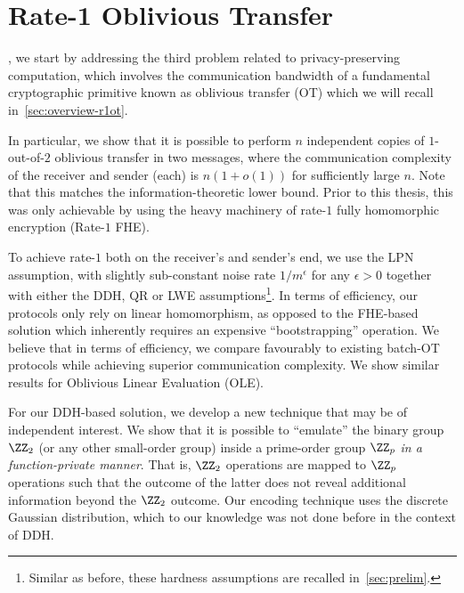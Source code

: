 
\chapter{Rate-1 Oblivious Transfer}
\label{sec:r1ot}
, we start by addressing the third problem related to privacy-preserving computation, which involves the communication bandwidth of a fundamental cryptographic primitive known as oblivious transfer (OT) which we will recall in~\cref{sec:overview-r1ot}.

In particular, we show that it is possible
to perform $n$ independent copies of $1$-out-of-$2$ oblivious transfer in two messages, where the communication complexity of the receiver and sender (each) is $n(1+o(1))$ for sufficiently large $n$. Note that this matches the information-theoretic lower bound. Prior to this thesis, this was only achievable by using the heavy machinery of rate-$1$ fully homomorphic encryption (Rate-$1$ FHE\cite{TCC:BDGM19}). 

To achieve rate-$1$ both on the receiver's and sender's end, we use the LPN assumption, with slightly sub-constant noise rate $1/m^{\epsilon}$ for any $\epsilon>0$ together with either the DDH, QR or LWE assumptions\footnote{Similar as before, these hardness assumptions are recalled in~\cref{sec:prelim}.}. In terms of efficiency, our protocols only rely on linear homomorphism, as opposed to the FHE-based solution which inherently requires an expensive ``bootstrapping'' operation. We believe that in terms of efficiency, we compare favourably to existing batch-OT protocols while achieving superior communication complexity. We show similar results for Oblivious Linear Evaluation (OLE).

For our DDH-based solution, we develop a new technique that may be of independent interest. We show that it is possible to ``emulate'' the binary group $\ZZ_2$ (or any other small-order group) inside a prime-order group $\ZZ_p$ \emph{in a function-private manner}. That is, $\ZZ_2$ operations are mapped to $\ZZ_p$ operations such that the outcome of the latter does not reveal additional information beyond the $\ZZ_2$ outcome. Our encoding technique uses the discrete Gaussian distribution, which to our knowledge was not done before in the context of DDH.


